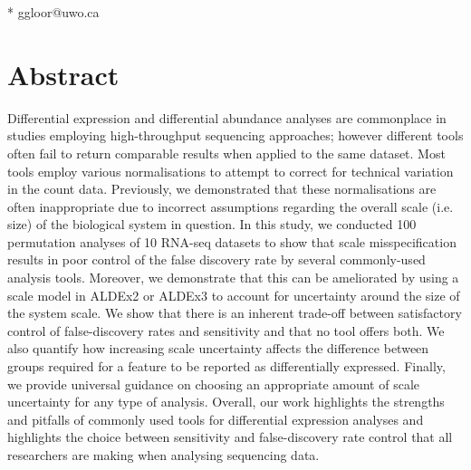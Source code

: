 \documentclass[10pt,letterpaper]{article}
\begin{document}
\begin{flushleft}



* ggloor@uwo.ca

\end{flushleft}


%
\section*{Abstract}
Differential expression and differential abundance analyses are commonplace in studies employing high-throughput sequencing approaches; however different tools often fail to return comparable results when applied to the same dataset. Most tools employ various normalisations to attempt to correct for technical variation in the count data. Previously, we demonstrated that these normalisations are often inappropriate due to incorrect assumptions regarding the overall scale (i.e. size) of the biological system in question. In this study, we conducted 100 permutation analyses of 10 RNA-seq datasets to show that scale misspecification results in poor control of the false discovery rate by several commonly-used analysis tools. Moreover, we demonstrate that this can be ameliorated by using a scale model in ALDEx2 or ALDEx3 to account for uncertainty around the size of the system scale. We show that there is an inherent trade-off between satisfactory control of false-discovery rates and sensitivity and that no tool offers both. We also quantify how increasing scale uncertainty affects the difference between groups required for a feature to be reported as differentially expressed. Finally, we provide universal guidance on choosing an appropriate amount of scale uncertainty for any type of analysis. Overall, our work highlights the strengths and pitfalls of commonly used tools for differential expression analyses and highlights the choice between sensitivity and false-discovery rate control that all researchers are making when analysing sequencing data.
\end{document}
